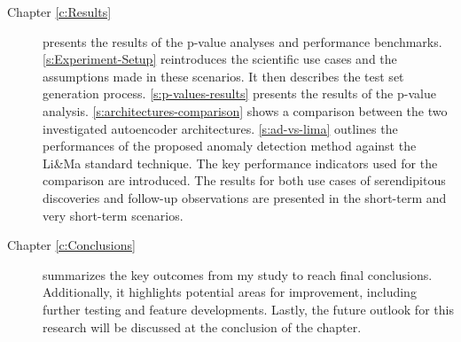 \begin{description}
  \item[Chapter \ref{c:Results}] presents the results of the p-value analyses and performance benchmarks. \autoref{s:Experiment-Setup} reintroduces the scientific use cases and the assumptions made in these scenarios. It then describes the test set generation process. \autoref{s:p-values-results} presents the results of the p-value analysis. \autoref{s:architectures-comparison} shows a comparison between the two investigated autoencoder architectures. \autoref{s:ad-vs-lima} outlines the performances of the proposed anomaly detection method against the Li\&Ma standard technique. The key performance indicators used for the comparison are introduced. The results for both use cases of serendipitous discoveries and follow-up observations are presented in the short-term and very short-term scenarios.

  \item[Chapter \ref{c:Conclusions}] summarizes the key outcomes from my study to reach final conclusions. Additionally, it highlights potential areas for improvement, including further testing and feature developments. Lastly, the future outlook for this research will be discussed at the conclusion of the chapter.

\end{description}




